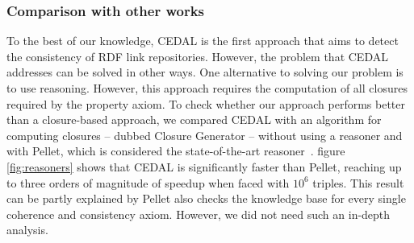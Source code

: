 \subsubsection{Comparison with other works}
To the best of our knowledge, CEDAL is the first approach that aims to detect the consistency of RDF link repositories. However, the problem that CEDAL addresses can be solved in other ways.
One alternative to solving our problem is to use reasoning. However, this approach requires the computation of all closures required by the property axiom.
To check whether our approach performs better than a closure-based approach, we compared CEDAL with an algorithm for computing closures -- dubbed Closure Generator -- without using a reasoner and with Pellet, which is considered the state-of-the-art reasoner~\cite{bockbenchmarking}. 
figure \ref{fig:reasoners} shows that CEDAL is significantly faster than Pellet, reaching up to three orders of magnitude of speedup when faced with $10^6$ triples.
This result can be partly explained by Pellet also checks the knowledge base for every single coherence and consistency axiom. However, we did not need such an in-depth analysis.

